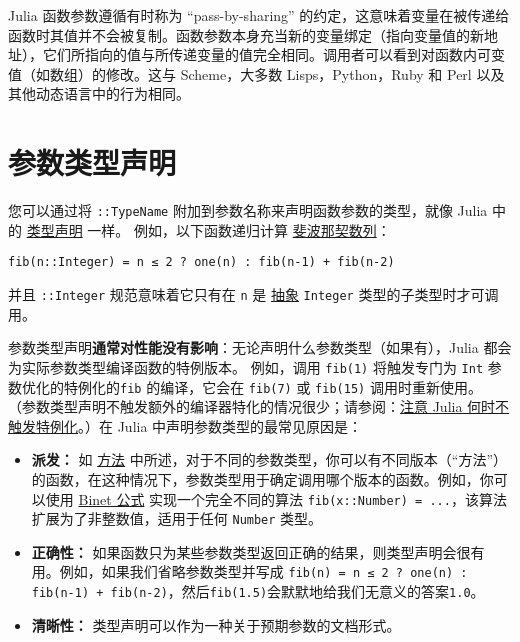 Julia 函数参数遵循有时称为 “pass-by-sharing” 的约定，这意味着变量在被传递给函数时其值并不会被复制。函数参数本身充当新的变量绑定（指向变量值的新地址），它们所指向的值与所传递变量的值完全相同。调用者可以看到对函数内可变值（如数组）的修改。这与 Scheme，大多数 Lisps，Python，Ruby 和 Perl 以及其他动态语言中的行为相同。



\hypertarget{7197754808287110454}{}


\section{参数类型声明}



您可以通过将 \texttt{::TypeName} 附加到参数名称来声明函数参数的类型，就像 Julia 中的 \href{@ref Type-Declarations}{类型声明} 一样。 例如，以下函数递归计算 \href{https://en.wikipedia.org/wiki/Fibonacci\_number}{斐波那契数列}：




\begin{lstlisting}
fib(n::Integer) = n ≤ 2 ? one(n) : fib(n-1) + fib(n-2)
\end{lstlisting}



并且 \texttt{::Integer} 规范意味着它只有在 \texttt{n} 是 \hyperlink{1549354324836889217}{抽象} \texttt{Integer} 类型的子类型时才可调用。



参数类型声明\textbf{通常对性能没有影响}：无论声明什么参数类型（如果有），Julia 都会为实际参数类型编译函数的特例版本。 例如，调用 \texttt{fib(1)} 将触发专门为 \texttt{Int} 参数优化的特例化的\texttt{fib} 的编译，它会在 \texttt{fib(7)} 或 \texttt{fib(15)} 调用时重新使用。 （参数类型声明不触发额外的编译器特化的情况很少；请参阅：\hyperlink{1848188334990571431}{注意 Julia 何时不触发特例化}。）在 Julia 中声明参数类型的最常见原因是：



\begin{itemize}
\item \textbf{派发：} 如 \hyperlink{3842379394166369470}{方法} 中所述，对于不同的参数类型，你可以有不同版本（“方法”）的函数，在这种情况下，参数类型用于确定调用哪个版本的函数。例如，你可以使用 \href{https://en.wikipedia.org/wiki/Fibonacci\_number\#Binet{\textquotesingle}s\_formula}{Binet 公式} 实现一个完全不同的算法 \texttt{fib(x::Number) = ...}，该算法扩展为了非整数值，适用于任何 \texttt{Number} 类型。


\item \textbf{正确性：} 如果函数只为某些参数类型返回正确的结果，则类型声明会很有用。例如，如果我们省略参数类型并写成 \texttt{fib(n) = n ≤ 2 ? one(n) : fib(n-1) + fib(n-2)}，然后\texttt{fib(1.5)}会默默地给我们无意义的答案\texttt{1.0}。


\item \textbf{清晰性：} 类型声明可以作为一种关于预期参数的文档形式。

\end{itemize}


